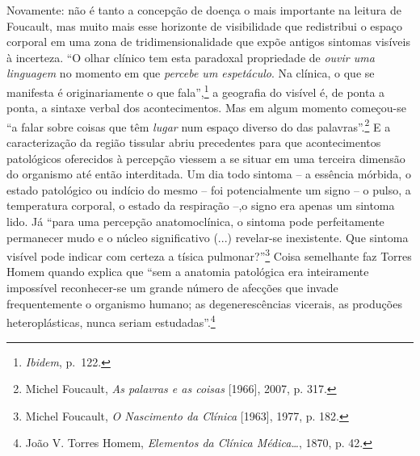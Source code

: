 Novamente: não é tanto a concepção de doença o mais importante na
leitura de Foucault, mas muito mais esse horizonte de visibilidade que
redistribui o espaço corporal em uma zona de tridimensionalidade que
expõe antigos sintomas visíveis à incerteza. ``O olhar clínico tem esta
paradoxal propriedade de \emph{ouvir uma linguagem} no momento em que
\emph{percebe um espetáculo}. Na clínica, o que se manifesta é
originariamente o que fala'',\footnote{\emph{Ibidem}, p.~122.} a
geografia do visível é, de ponta a ponta, a sintaxe verbal dos
acontecimentos. Mas em algum momento começou-se ``a falar sobre coisas
que têm \emph{lugar} num espaço diverso do das palavras''.\footnote{Michel
  Foucault, \emph{As palavras e as coisas} {[}1966{]}, 2007, p. 317.} E
a caracterização da região tissular abriu precedentes para que
acontecimentos patológicos oferecidos à percepção viessem a se situar em
uma terceira dimensão do organismo até então interditada. Um dia todo
sintoma -- a essência mórbida, o estado patológico ou indício do mesmo
-- foi potencialmente um signo -- o pulso, a temperatura corporal, o
estado da respiração --,o signo era apenas um sintoma lido. Já ``para
uma percepção anatomoclínica, o sintoma pode perfeitamente permanecer
mudo e o núcleo significativo (...) revelar-se inexistente. Que sintoma
visível pode indicar com certeza a tísica pulmonar?''\footnote{Michel
  Foucault, \emph{O Nascimento da Clínica} {[}1963{]}, 1977, p. 182.}
Coisa semelhante faz Torres Homem quando explica que ``sem a anatomia
patológica era inteiramente impossível reconhecer-se um grande número de
afecções que invade frequentemente o organismo humano; as
degenerescências vicerais, as produções heteroplásticas, nunca seriam
estudadas''.\footnote{João V. Torres Homem, \emph{Elementos da Clínica
  Médica\ldots{}}, 1870, p. 42.}

